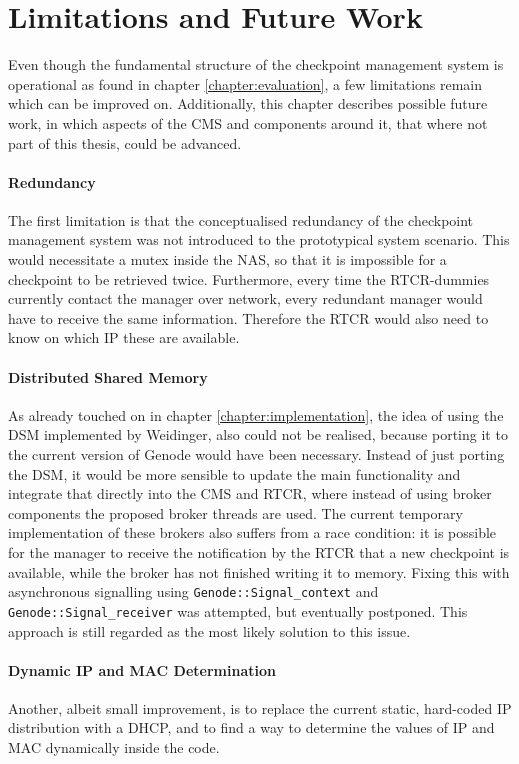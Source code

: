 
\chapter{Limitations and Future Work}\label{chapter:limitations_and_future_work}
Even though the fundamental structure of the checkpoint management system is operational as found in chapter \ref{chapter:evaluation}, a few limitations remain which can be improved on. Additionally, this chapter describes possible future work, in which aspects of the CMS and components around it, that where not part of this thesis, could be advanced. 
\subsubsection{Redundancy}
The first limitation is that the conceptualised redundancy of the checkpoint management system was not introduced to the prototypical system scenario. This would necessitate a mutex inside the NAS, so that it is impossible for a checkpoint to be retrieved twice. Furthermore, every time the RTCR-dummies currently contact the manager over network, every redundant manager would have to receive the same information. Therefore the RTCR would also need to know on which IP these are available.
\subsubsection{Distributed Shared Memory}
As already touched on in chapter \ref{chapter:implementation}, the idea of using the DSM implemented by Weidinger, also could not be realised, because porting it to the current version of Genode would have been necessary. Instead of just porting the DSM, it would be more sensible to update the main functionality and integrate that directly into the CMS and RTCR, where instead of using broker components the proposed broker threads are used. 
The current temporary implementation of these brokers also suffers from a race condition: it is possible for the manager to receive the notification by the RTCR that a new checkpoint is available, while the broker has not finished writing it to memory. Fixing this with asynchronous signalling using \verb|Genode::Signal_context| and \verb|Genode::Signal_receiver| was attempted, but eventually postponed. This approach is still regarded as the most likely solution to this issue.
\subsubsection{Dynamic IP and MAC Determination}
Another, albeit small improvement, is to replace the current static, hard-coded IP distribution with a DHCP, and to find a way to determine the values of IP and MAC dynamically inside the code.
